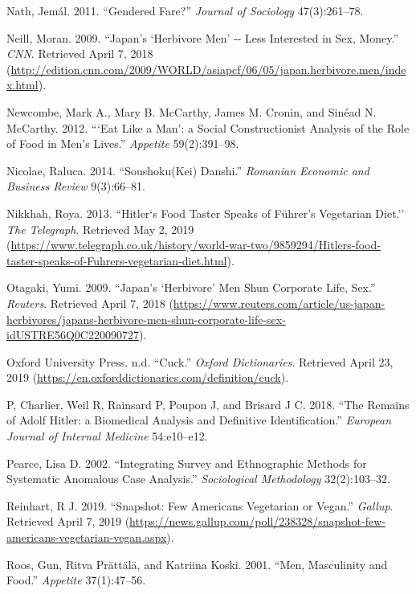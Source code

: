 \documentclass[twoside]{report}
\begin{document}
\hypertarget{nath}{Nath, Jemál. 2011. ``Gendered Fare?'' \emph{Journal of Sociology}
47(3):261--78.}

\hypertarget{neill}{Neill, Moran. 2009. ``Japan's `Herbivore Men' -\/- Less Interested in
Sex, Money.'' \emph{CNN}. Retrieved April 7, 2018
(\url{http://edition.cnn.com/2009/WORLD/asiapcf/06/05/japan.herbivore.men/index.html}).}

\hypertarget{newcombe}{Newcombe, Mark A., Mary B. McCarthy, James M. Cronin, and Sinéad N.
McCarthy. 2012. ```Eat Like a Man': a Social Constructionist Analysis of
the Role of Food in Men's Lives.'' \emph{Appetite} 59(2):391--98.}

\hypertarget{nicolae}{Nicolae, Raluca. 2014. ``Soushoku(Kei) Danshi.'' \emph{Romanian Economic
and Business Review} 9(3):66--81.}

\hypertarget{nikkhah}{Nikkhah, Roya. 2013. ``Hitler`s Food Taster Speaks of Führer's
Vegetarian Diet.'' \emph{The Telegraph}. Retrieved May 2, 2019
(\url{https://www.telegraph.co.uk/history/world-war-two/9859294/Hitlers-food-taster-speaks-of-Fuhrers-vegetarian-diet.html}).}

\hypertarget{otagaki}{Otagaki, Yumi. 2009. ``Japan's `Herbivore' Men Shun Corporate Life,
Sex.'' \emph{Reuters}. Retrieved April 7, 2018
(\url{https://www.reuters.com/article/us-japan-herbivores/japans-herbivore-men-shun-corporate-life-sex-idUSTRE56Q0C220090727}).}

\hypertarget{oxford}{Oxford University Press. n.d. ``Cuck.'' \emph{Oxford Dictionaries}.
Retrieved April 23, 2019
(\url{https://en.oxforddictionaries.com/definition/cuck}).}

\hypertarget{p}{P, Charlier, Weil R, Rainsard P, Poupon J, and Brisard J C. 2018. ``The
Remains of Adolf Hitler: a Biomedical Analysis and Definitive
Identification.'' \emph{European Journal of Internal Medicine}
54:e10--e12.}

\hypertarget{pearce}{Pearce, Lisa D. 2002. ``Integrating Survey and Ethnographic Methods for
Systematic Anomalous Case Analysis.'' \emph{Sociological Methodology}
32(2):103--32.}

\hypertarget{reinhart}{Reinhart, R J. 2019. ``Snapshot: Few Americans Vegetarian or Vegan.''
\emph{Gallup}. Retrieved April 7, 2019
(\href{https://news.gallup.com/poll/238328/snapshot-few-americans-vegetarian-ve-gan.aspx}{https://news.gallup.com/poll/238328/snapshot-few-americans-vegetarian-vegan.aspx}).}

\hypertarget{roos}{Roos, Gun, Ritva Prättälä, and Katriina Koski. 2001. ``Men, Masculinity
and Food.'' \emph{Appetite} 37(1):47--56.}
\end{document}
